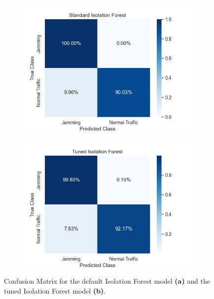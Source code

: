 \documentclass[futureinternet,article,submit,pdftex,moreauthors]{Definitions/mdpi}
\begin{document}
\begin{figure}[H]
	\centering
	\begin{subfigure}{0.49\textwidth}
		\centering
		\includegraphics[width=\textwidth]{img/ConfusionMatrixStandardIF.png}
		\caption{}
		\label{fig:ConfusionMatrixStandardIF}
	\end{subfigure}
	\hfill
	\begin{subfigure}{0.49\textwidth}
		\centering
		\includegraphics[width=\textwidth]{img/ConfusionMatrixTunedIF.png}
		\caption{}
		\label{fig:ConfusionMatrixTunedIF}
	\end{subfigure}
	\caption{Confusion Matrix for the default Isolation Forest model \textbf{(a)} and the tuned Isolation Forest model \textbf{(b)}.}
	\label{fig:ConfusionMatrixStandardTunedIF}
\end{figure}
\end{document}
